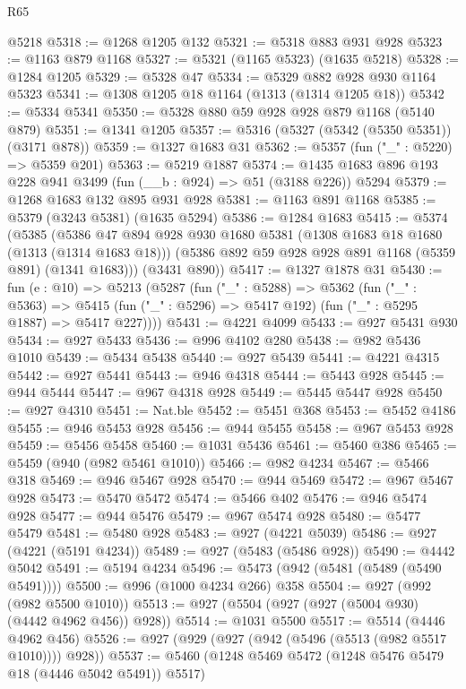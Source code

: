 \begin{lexlean}{R65}
\begin{coremodule}
    @5218
@5318 := @1268 @1205 @132
@5321 := @5318 @883 @931 @928
@5323 := @1163 @879 @1168
@5327 := @5321 (@1165 @5323) (@1635 @5218)
@5328 := @1284 @1205
@5329 := @5328 @47
@5334 := @5329 @882 @928 @930 @1164 @5323
@5341 := @1308 @1205 @18 @1164 (@1313 (@1314 @1205 @18))
@5342 := @5334 @5341
@5350 := @5328 @880 @59 @928 @928 @879 @1168 (@5140 @879)
@5351 := @1341 @1205
@5357 := @5316 (@5327 (@5342 (@5350 @5351)) (@3171 @878))
@5359 := @1327 @1683 @31
@5362 := @5357 (fun ("_" : @5220) => @5359 @201)
@5363 := @5219 @1887
@5374 := @1435 @1683 @896 @193 @228 @941 @3499 (fun (__b : @924) => @51 (@3188 @226)) @5294
@5379 := @1268 @1683 @132 @895 @931 @928
@5381 := @1163 @891 @1168
@5385 := @5379 (@3243 @5381) (@1635 @5294)
@5386 := @1284 @1683
@5415 := @5374
    (@5385
      (@5386
        @47
        @894
        @928
        @930
        @1680
        @5381
        (@1308 @1683 @18 @1680 (@1313 (@1314 @1683 @18)))
        (@5386 @892 @59 @928 @928 @891 @1168 (@5359 @891) (@1341 @1683)))
      (@3431 @890))
@5417 := @1327 @1878 @31
@5430 := fun (e : @10) =>
  @5213
    (@5287
      (fun ("_" : @5288) =>
      @5362
        (fun ("_" : @5363) =>
        @5415 (fun ("_" : @5296) => @5417 @192) (fun ("_" : @5295 @1887) => @5417 @227))))
@5431 := @4221 @4099
@5433 := @927 @5431 @930
@5434 := @927 @5433
@5436 := @996 @4102 @280
@5438 := @982 @5436 @1010
@5439 := @5434 @5438
@5440 := @927 @5439
@5441 := @4221 @4315
@5442 := @927 @5441
@5443 := @946 @4318
@5444 := @5443 @928
@5445 := @944 @5444
@5447 := @967 @4318 @928
@5449 := @5445 @5447 @928
@5450 := @927 @4310
@5451 := Nat.ble
@5452 := @5451 @368
@5453 := @5452 @4186
@5455 := @946 @5453 @928
@5456 := @944 @5455
@5458 := @967 @5453 @928
@5459 := @5456 @5458
@5460 := @1031 @5436
@5461 := @5460 @386
@5465 := @5459 (@940 (@982 @5461 @1010))
@5466 := @982 @4234
@5467 := @5466 @318
@5469 := @946 @5467 @928
@5470 := @944 @5469
@5472 := @967 @5467 @928
@5473 := @5470 @5472
@5474 := @5466 @402
@5476 := @946 @5474 @928
@5477 := @944 @5476
@5479 := @967 @5474 @928
@5480 := @5477 @5479
@5481 := @5480 @928
@5483 := @927 (@4221 @5039)
@5486 := @927 (@4221 (@5191 @4234))
@5489 := @927 (@5483 (@5486 @928))
@5490 := @4442 @5042
@5491 := @5194 @4234
@5496 := @5473 (@942 (@5481 (@5489 (@5490 @5491))))
@5500 := @996 (@1000 @4234 @266) @358
@5504 := @927 (@992 (@982 @5500 @1010))
@5513 := @927 (@5504 (@927 (@927 (@5004 @930) (@4442 @4962 @456)) @928))
@5514 := @1031 @5500
@5517 := @5514 (@4446 @4962 @456)
@5526 := @927 (@929 (@927 (@942 (@5496 (@5513 (@982 @5517 @1010)))) @928))
@5537 := @5460 (@1248 @5469 @5472 (@1248 @5476 @5479 @18 (@4446 @5042 @5491)) @5517)

\end{coremodule}
\end{lexlean}
